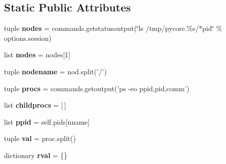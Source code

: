 \subsection*{Static Public Attributes}
\begin{DoxyCompactItemize}
\item 
\hypertarget{classperflogserver_1_1_log_session_a7aab4523f7440f2e76fc2bad379efb2d}{tuple {\bfseries nodes} = commands.\+getstatusoutput(\char`\"{}ls /tmp/pycore.\%s/$\ast$pid\char`\"{} \% options.\+session)}\label{classperflogserver_1_1_log_session_a7aab4523f7440f2e76fc2bad379efb2d}

\item 
\hypertarget{classperflogserver_1_1_log_session_a30f676502608263701d10ed67e076825}{list {\bfseries nodes} = nodes\mbox{[}1\mbox{]}}\label{classperflogserver_1_1_log_session_a30f676502608263701d10ed67e076825}

\item 
\hypertarget{classperflogserver_1_1_log_session_ad326caac74112105c42874cc21215037}{tuple {\bfseries nodename} = nod.\+split('/')}\label{classperflogserver_1_1_log_session_ad326caac74112105c42874cc21215037}

\item 
\hypertarget{classperflogserver_1_1_log_session_aeb3c167678118a1fbd288f7ea341c69c}{tuple {\bfseries procs} = commands.\+getoutput('ps -\/eo ppid,pid,comm')}\label{classperflogserver_1_1_log_session_aeb3c167678118a1fbd288f7ea341c69c}

\item 
\hypertarget{classperflogserver_1_1_log_session_a6e7a17c8f3c26283912c11a7228c91f4}{list {\bfseries childprocs} = \mbox{[}$\,$\mbox{]}}\label{classperflogserver_1_1_log_session_a6e7a17c8f3c26283912c11a7228c91f4}

\item 
\hypertarget{classperflogserver_1_1_log_session_a40f54cc1c4df17634f110f210962bb8c}{list {\bfseries ppid} = self.\+pids\mbox{[}nname\mbox{]}}\label{classperflogserver_1_1_log_session_a40f54cc1c4df17634f110f210962bb8c}

\item 
\hypertarget{classperflogserver_1_1_log_session_a799662e49c06431ee248b0733561e33d}{tuple {\bfseries val} = proc.\+split()}\label{classperflogserver_1_1_log_session_a799662e49c06431ee248b0733561e33d}

\item 
\hypertarget{classperflogserver_1_1_log_session_a0db1d7f793cb8576d1d9237654ce6bd8}{dictionary {\bfseries rval} = \{\}}\label{classperflogserver_1_1_log_session_a0db1d7f793cb8576d1d9237654ce6bd8}


\end{DoxyCompactItemize}
